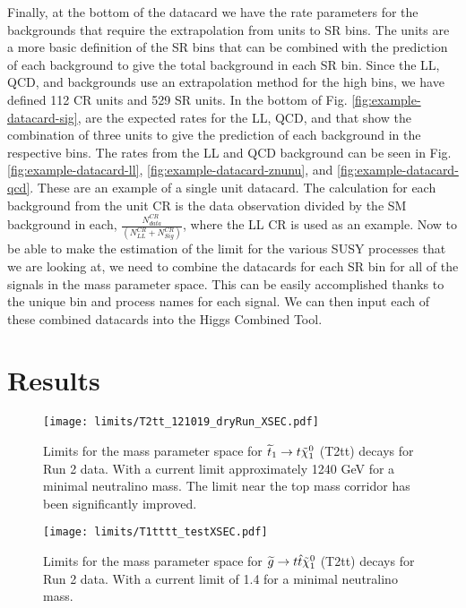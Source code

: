 Finally, at the bottom of the datacard we have the rate parameters for the backgrounds that require the extrapolation from units to SR bins. The units are a more basic definition of the SR bins that can be combined with the prediction of each background to give the total background in each SR bin. Since the LL, QCD, and \Znunu{} backgrounds use an extrapolation method for the high \dm{} bins, we have defined 112 CR units and 529 SR units. In the bottom of Fig. \ref{fig:example-datacard-sig}, are the expected rates for the LL, QCD, and \Znunu{} that show the combination of three units to give the prediction of each background in the respective bins. The rates from the LL and QCD background can be seen in Fig. \ref{fig:example-datacard-ll}, \ref{fig:example-datacard-znunu}, and  \ref{fig:example-datacard-qcd}. These are an example of a single unit datacard. The calculation for each background from the unit CR is the data observation divided by the SM background in each, $\frac{N_{data}^{CR}}{(N_{LL}^{CR} + N_{Sig}^{CR})}$, where the LL CR is used as an example. Now to be able to make the estimation of the limit for the various SUSY processes that we are looking at, we need to combine the datacards for each SR bin for all of the signals in the mass parameter space. This can be easily accomplished thanks to the unique bin and process names for each signal. We can then input each of these combined datacards into the Higgs Combined Tool.

\section{Results}\label{sec:Results}

\begin{figure}
	\begin{center}
  \texttt{[image: limits/T2tt\_121019\_dryRun\_XSEC.pdf]}
	\end{center}
	\caption[Run 2: T2tt Limits]{Limits for the mass parameter space for $\widetilde{t}_1\rightarrow t \tilde{\chi}^{0}_{1}$ (T2tt) decays for Run 2 data. With a current limit approximately 1240 GeV for a minimal neutralino mass. The limit near the top mass corridor has been significantly improved.
	 }
	\label{fig:Run2-T2tt-limits}
\end{figure}

\begin{figure}
	\begin{center}
  \texttt{[image: limits/T1tttt\_testXSEC.pdf]}
	\end{center}
	\caption[Run 2: T2tt Limits]{Limits for the mass parameter space for $\widetilde{g}\rightarrow t\hat{t}\tilde{\chi}^{0}_{1}$ (T2tt) decays for Run 2 data. With a current limit of 1.4 \TeV{} for a minimal neutralino mass.
	 }
	\label{fig:Run2-T1tttt-limits}
\end{figure}

